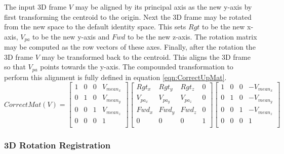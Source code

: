 The input 3D frame $V$ may be aligned by its principal axis as the new y-axis by first transforming the centroid to the origin. Next the 3D frame may be rotated from the new space to the default identity space. This sets $Rgt$ to be the new x-axis, $V_{pa}$ to be the new y-axis and $Fwd$ to be the new z-axis. The rotation matrix may be computed as the row vectors of these axes. Finally, after the rotation the 3D frame $V$ may be transformed back to the centroid. This aligns the 3D frame so that $V_{pa}$ points towards the y-axis. The compounded transformation to perform this alignment is fully defined in equation \ref{eqn:CorrectUpMat}. \\

\begin{equation} \label{eqn:CorrectUpMat}
CorrectMat(V) = \left[
\begin{array}{cccc}
1 & 0 & 0 & V_{mean_x} \\
0 & 1 & 0 & V_{mean_y} \\
0 & 0 & 1 & V_{mean_z} \\
0 & 0 & 0 & 1 \\
\end{array}
\right] \left[
\begin{array}{cccc}
Rgt_x & Rgt_y & Rgt_z & 0 \\
V_{pa_x} & V_{pa_y} & V_{pa_z} & 0 \\
Fwd_x & Fwd_y & Fwd_z & 0 \\
0 & 0 & 0 & 1 \\
\end{array}
\right] \left[
\begin{array}{cccc}
1 & 0 & 0 & -V_{mean_x} \\
0 & 1 & 0 & -V_{mean_y} \\
0 & 0 & 1 & -V_{mean_z} \\
0 & 0 & 0 & 1 \\
\end{array}
\right]
\end{equation}

\subsubsection{3D Rotation Registration}

